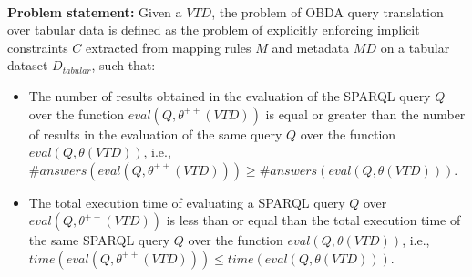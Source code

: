 \paragraph{}\noindent\textbf{Problem statement:} Given a $VTD$, the problem of OBDA query translation over tabular data is defined as the problem of explicitly enforcing implicit constraints $C$ extracted from mapping rules $M$ and metadata $MD$ on a tabular dataset $D_{tabular}$, such that: 
\begin{itemize}
    \item The number of results obtained in the evaluation of the SPARQL query $Q$ over the function $eval(Q,\theta^{++}(VTD))$ is equal or greater than the number of results in the evaluation of the same query $Q$ over the function $eval(Q,\theta(VTD))$, i.e., \\ $\#answers(eval(Q,\theta^{++}(VTD))) \geq  \#answers(eval(Q,\theta(VTD)))$.
    \item The total execution time of evaluating a SPARQL query $Q$ over $eval(Q,\theta^{++}(VTD))$ is %
    less than or equal than the total execution time of the same SPARQL query $Q$ over the function $eval(Q,\theta(VTD))$, i.e.,\\ $time(eval(Q,\theta^{++}(VTD))) \leq 
    time(eval(Q,\theta(VTD)))$. 
\end{itemize}


